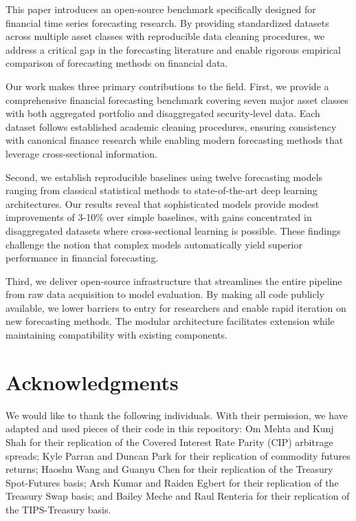 \documentclass{article}
\begin{document}
This paper introduces an open-source benchmark specifically designed for financial time series forecasting research. By providing standardized datasets across multiple asset classes with reproducible data cleaning procedures, we address a critical gap in the forecasting literature and enable rigorous empirical comparison of forecasting methods on financial data.

Our work makes three primary contributions to the field. First, we provide a comprehensive financial forecasting benchmark covering seven major asset classes with both aggregated portfolio and disaggregated security-level data. Each dataset follows established academic cleaning procedures, ensuring consistency with canonical finance research while enabling modern forecasting methods that leverage cross-sectional information.

Second, we establish reproducible baselines using twelve forecasting models ranging from classical statistical methods to state-of-the-art deep learning architectures. Our results reveal that sophisticated models provide modest improvements of 3-10\% over simple baselines, with gains concentrated in disaggregated datasets where cross-sectional learning is possible. These findings challenge the notion that complex models automatically yield superior performance in financial forecasting.

Third, we deliver open-source infrastructure that streamlines the entire pipeline from raw data acquisition to model evaluation. By making all code publicly available, we lower barriers to entry for researchers and enable rapid iteration on new forecasting methods. The modular architecture facilitates extension while maintaining compatibility with existing components.


\section*{Acknowledgments}

We would like to thank the following individuals. With their permission, we have adapted and used pieces of their code in this repository: Om Mehta and Kunj Shah for their replication of the Covered Interest Rate Parity (CIP) arbitrage spreads; Kyle Parran and Duncan Park for their replication of commodity futures returns; Haoshu Wang and Guanyu Chen for their replication of the Treasury Spot-Futures basis; Arsh Kumar and Raiden Egbert for their replication of the Treasury Swap basis; and Bailey Meche and Raul Renteria for their replication of the TIPS-Treasury basis.
\end{document}
